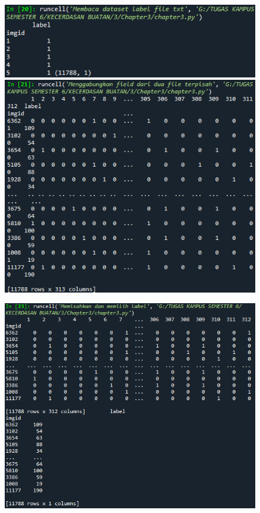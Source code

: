 \begin{enumerate}
\begin{figure}[ht]
          \end{figure}
          \newpage
          \begin{figure}[ht]
              \centerline{\includegraphics[scale=0.7]{figures/chapter3-4d.png}}
              \centerline{\includegraphics[scale=0.7]{figures/chapter3-4e.png}}
          \end{figure}
          \newpage
          \begin{figure}[ht]
              \centerline{\includegraphics[scale=0.7]{figures/chapter3-4f.png}}

\end{figure}
\end{enumerate}
